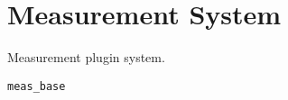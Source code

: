 \section{Measurement System}
\label{sec:meas}

Measurement plugin system.

\texttt{meas\_base}















